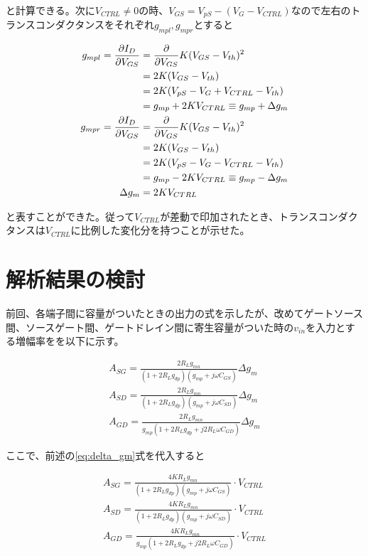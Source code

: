 \documentclass[twocolumn]{jsarticle}
\begin{document}
と計算できる。次に$V_{CTRL}\neq0$の時、$V_{GS}=V_{pS}- \left( V_{G}-V_{CTRL} \right)$なので左右のトランスコンダクタンスをそれぞれ$g_{mpl},g_{mpr}$とすると

\begin{align}
    g_{mpl} = \frac{\partial I_{D}}{\partial V_{GS}} &= \frac{\partial}{\partial V_{GS}} K(V_{GS}-V_{th})^{2} \notag\\
    &=2K(V_{GS}-V_{th})    \notag\\ 
    &=2K(V_{pS}-V_{G}+V_{CTRL}-V_{th})  \notag\\
    &=g_{mp}+2KV_{CTRL}\equiv g_{mp}+\Delta g_{m}   \label{eq:g_mpl}\\
    g_{mpr} = \frac{\partial I_{D}}{\partial V_{GS}} &= \frac{\partial}{\partial V_{GS}} K(V_{GS}-V_{th})^{2} \notag\\
    &=2K(V_{GS}-V_{th})    \notag\\ 
    &=2K(V_{pS}-V_{G}-V_{CTRL}-V_{th})  \notag\\
    &=g_{mp}-2KV_{CTRL}\equiv g_{mp}-\Delta g_{m}   \label{eq:g_mpr}\\
    \Delta g_{m}&=2KV_{CTRL}   \label{eq:delta_gm}
\end{align}

と表すことができた。従って$V_{CTRL}$が差動で印加されたとき、トランスコンダクタンスは$V_{CTRL}$に比例した変化分を持つことが示せた。

\section{解析結果の検討}
前回、各端子間に容量がついたときの出力の式を示したが、改めてゲートソース間、ソースゲート間、ゲートドレイン間に寄生容量がついた時の$v_{in}$を入力とする増幅率をを以下に示す。

\begin{align*}
    A_{SG}=\frac{2R_{L}g_{mn}}{ (1+2R_{L}g_{dp})(g_{mp}+j\omega C_{GS}) }\Delta g_{m}  \\
    A_{SD}=\frac{2R_{L}g_{mn}}{ (1+2R_{L}g_{dp})(g_{mp}+j\omega C_{SD}) }\Delta g_{m}  \\
    A_{GD}=\frac{2R_{L}g_{mn} }{ g_{mp}(1+2R_{L}g_{dp} + j2R_{L}\omega C_{GD}) }\Delta g_{m}  
\end{align*}

ここで、前述の\eqref{eq:delta_gm}式を代入すると

\begin{align}
    A_{SG}=\frac{4KR_{L}g_{mn} }{ (1+2R_{L}g_{dp})(g_{mp}+j\omega C_{GS}) }\cdot V_{CTRL}  \label{eq:a_sg}\\
    A_{SD}=\frac{4KR_{L}g_{mn} }{ (1+2R_{L}g_{dp})(g_{mp}+j\omega C_{SD}) }\cdot V_{CTRL}  \label{eq:a_sd}\\
    A_{GD}=\frac{4KR_{L}g_{mn} }{ g_{mp}(1+2R_{L}g_{dp} + j2R_{L}\omega C_{GD}) }\cdot V_{CTRL}    \label{eq:a_gd}
\end{align}
\end{document}
